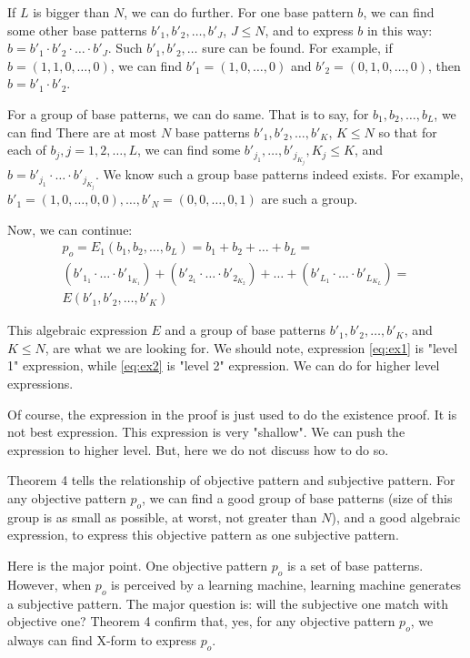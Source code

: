 If $L$ is bigger than $N$, we can do further. For one base pattern $b$, we can find some other base patterns $b'_1, b'_2, \ldots, b'_J$, $J \le N$, and to express $b$ in this way:  $b = b'_1 \cdot  b'_2 \cdot \ldots \cdot b'_J$. Such $b'_1, b'_2, \ldots$ sure can be found. For example, if $b = (1, 1, 0, \ldots, 0)$, we can find $b'_1 = (1, 0, \ldots, 0)$ and $b'_2 = (0, 1, 0, \ldots, 0)$, then $b = b'_1 \cdot b'_2$. 

 
For a group of base patterns, we can do same. That is to say, for $b_1, b_2, \ldots, b_L$, we can find There are at most $N$ base patterns $b'_1, b'_2, \ldots, b'_K$, $K \le N$ so that for each of $b_j, j = 1, 2, \ldots, L$, we can  find some $b'_{j_1}, \ldots, b'_{j_{K_j}}, K_j \le K$, and $b = b'_{j_1} \cdot \ldots \cdot b'_{j_{K_j}}$. We know such a group base patterns indeed exists. For example, $b'_1 = (1, 0, \ldots, 0, 0), \ldots, b'_N = (0, 0, \ldots, 0, 1)$ are such a group.


Now, we can continue: 
\begin{multline}
p_o = E_1(b_1, b_2, \ldots, b_L) = b_1 + b_2 + \ldots + b_L =  \\ 
(b'_{1_1} \cdot \ldots \cdot b'_{1_{K_1}}) + (b'_{2_1} \cdot \ldots \cdot b'_{2_{K_2}})  +  \ldots +  (b'_{L_1} \cdot \ldots \cdot b'_{L_{K_L}}) = \\
E(b'_1, b'_2, \ldots, b'_K)  \label{eq:ex2}  \tag{2}
\end{multline}

This algebraic expression $E$ and a group of base patterns $b'_1, b'_2, \ldots, b'_K$, and $K \le N$, are what we are looking for. We should note, expression \eqref{eq:ex1} is "level 1" expression, while \eqref{eq:ex2} is "level 2" expression. We can do for higher level expressions. 


Of course, the expression in the proof is just used to do the existence proof. It is not best expression. This expression is very "shallow". We can push the expression to higher level. But, here we do not discuss how to do so.


Theorem 4 tells the relationship of objective pattern and subjective pattern. For any objective pattern $p_o$, we can find a good group of base patterns (size of this group is as small as possible, at worst, not greater than $N$), and a good algebraic expression, to express this objective pattern as one subjective pattern. 

Here is the major point. One objective pattern $p_o$ is a set of base patterns. However, when $p_o$ is perceived by a learning machine, learning machine generates a subjective pattern. The major question is: will the subjective one match with objective one? Theorem 4 confirm that, yes, for any objective pattern $p_o$, we always can find X-form to express $p_o$. 

